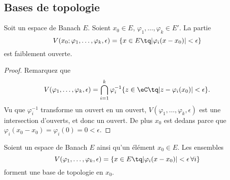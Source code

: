 \subsection{Bases de topologie}


\begin{lemma}			\label{LEMooEFVXooIWBBdW}
	Soit un espace de Banach \( E\). Soient \( x_0\in E\), \( \varphi_1,\ldots, \varphi_k\in E'\). La partie
	\begin{equation}
		V(x_0;\varphi_1,\ldots, \varphi_k,\epsilon)=\{ x\in E\tq | \varphi_i(x-x_0) |<\epsilon \}
	\end{equation}
	est faiblement ouverte.
\end{lemma}

\begin{proof}
	Remarquez que
	\begin{equation}
		V(\varphi_1,\ldots, \varphi_k,\epsilon)=\bigcap_{i=1}^k\varphi_i^{-1}\{ z\in \eC\tq | z-\varphi_i(x_0) | <\epsilon \}.
	\end{equation}
	Vu que \( \varphi_i^{-1}\) transforme un ouvert en un ouvert, \( V(\varphi_1,\ldots, \varphi_k,\epsilon)\) est une intersection d'ouverts, et donc un ouvert. De plus \( x_0\) est dedans parce que \( \varphi_i(x_0-x_0)=\varphi_i(0)=0 <\epsilon\).
\end{proof}

\begin{lemma}
	Soient un espace de Banach \( E\) ainsi qu'un élément \( x_0\in E\). Les ensembles
	\begin{equation}
		V(\varphi_1,\ldots, \varphi_k,\epsilon)=\{ x\in E\tq | \varphi_i(x-x_0) |<\epsilon\,\forall i \}
	\end{equation}
	forment une base de topologie en \( x_0\).
\end{lemma}

